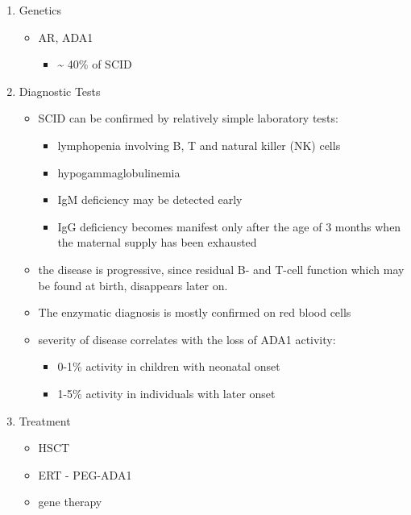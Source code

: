 \documentclass{scrartcl}
\begin{document}
\begin{enumerate}
\item Genetics
\label{sec:orge25c055}
\begin{itemize}
\item AR, ADA1
\begin{itemize}
\item \textasciitilde{} 40\% of SCID
\end{itemize}
\end{itemize}

\item Diagnostic Tests
\label{sec:orgc407cc0}
\begin{itemize}
\item SCID can be confirmed by relatively simple laboratory tests:
\begin{itemize}
\item lymphopenia involving B, T and natural killer (NK) cells
\item hypogammaglobulinemia
\item IgM deficiency may be detected early
\item IgG deficiency becomes manifest only after the age of 3 months
when the maternal supply has been exhausted
\end{itemize}
\item the disease is progressive, since residual B- and T-cell function
which may be found at birth, disappears later on.

\item The enzymatic diagnosis is mostly confirmed on red blood cells
\item severity of disease correlates with the loss of ADA1 activity:
\begin{itemize}
\item 0-1\% activity in children with neonatal onset
\item 1-5\% activity in individuals with later onset
\end{itemize}
\end{itemize}

\item Treatment
\label{sec:org02da75d}
\begin{itemize}
\item HSCT
\item ERT - PEG-ADA1
\item gene therapy
\end{itemize}
\end{enumerate}
\end{document}
